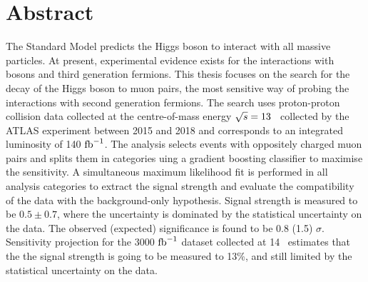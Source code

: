 \chapter*{Abstract}

The Standard Model predicts the Higgs boson to interact
with all massive particles. At present, experimental
evidence exists for the interactions with bosons and 
third generation fermions. This thesis focuses on the
search for the decay of the Higgs boson to muon pairs,
the most sensitive way of probing the interactions with
second generation fermions. The search uses proton-proton
collision data collected at the centre-of-mass energy
$\sqrt{s} = 13$ \TeV~collected by the ATLAS experiment
between 2015 and 2018 and corresponds to an integrated
luminosity of 140 $\text{fb}^{-1}$. The analysis selects events
with oppositely charged muon pairs and splits them in
categories uing a gradient boosting classifier to maximise
the sensitivity. A simultaneous maximum likelihood fit
is performed in all analysis categories to extract the
signal strength and evaluate the compatibility of the
data with the background-only hypothesis. Signal strength
is measured to be $0.5 \pm 0.7$, where the uncertainty is
dominated by the statistical uncertainty on the data.
The observed (expected) significance is found to be
0.8 (1.5) $\sigma$. Sensitivity projection for the 3000
$\text{fb}^{-1}$ dataset collected at 14 \TeV~estimates that the 
the signal strength is going to be measured to 13\%,
and still limited by the statistical uncertainty on the
data.


\thispagestyle{empty}
